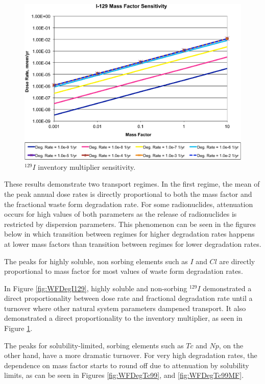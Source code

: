 \begin{figure}[H]
  \centering
  \includegraphics[width=\linewidth]{I129_mass_factor.eps}
  \caption{$^{129}I$ inventory multiplier sensitivity.}
  \label{fig:WFDegI129MF}
\end{figure}

These results demonstrate two transport regimes. In the first regime, the mean 
of the peak annual dose rates is directly proportional to both the mass factor 
and the fractional waste form degradation rate. For some radionuclides, 
attenuation occurs for high values of both parameters as the release of 
radionuclides is restricted by dispersion parameters. This phenomenon can be seen 
in the figures below in which transition between regimes for higher degradation 
rates happens at lower mass factors than transition between regimes for lower 
degradation rates. 

The peaks for highly soluble, non sorbing elements such as $I$ and $Cl$
are directly proportional to mass factor for most 
values of waste form degradation rates. 

In Figure \ref{fig:WFDegI129}, highly soluble and non-sorbing $^{129}I$ 
demonstrated a direct proportionality between dose rate and fractional 
degradation rate until a turnover where other natural system parameters dampened 
transport. It also demonstrated a direct proportionality to the inventory 
multiplier, as seen in Figure \ref{fig:WFDegI129MF}. 

The peaks for solubility-limited, sorbing elements such as $Tc$ and $Np$, on the 
other hand, have a more dramatic turnover.  For very high degradation rates, the 
dependence on mass factor starts to round off due to attenuation by solubility 
limits, as can be seen in Figures 
\ref{fig:WFDegTc99}, and \ref{fig:WFDegTc99MF}.

